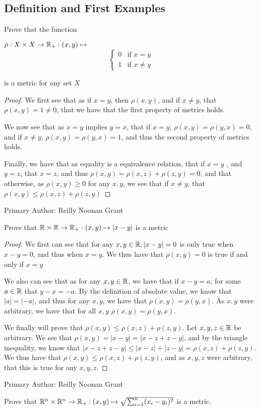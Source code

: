 \subsection{Definition and First Examples}

\begin{majorEx}%
  Prove that the function
  \begin{center}
  $\rho : X \times X \rightarrow \mathbb{R}_+ : (x,y) \mapsto $
  \[ \begin{cases} 
    0 & \text{if } x=y \\
    1 & \text{if } x \neq y 
  \end{cases}
  \]
\end{center}
\end{majorEx}
is a metric for any set $X$
\begin{proof}
   We first see that as if $x=y$, then $\rho(x,y)$, and if $x\neq y$, that $\rho(x,y)=1\neq 0$, that we have that the first property of metrics holds.

   We now see that as $x=y$ implies $y=x$, that if $x=y$, 
   $\rho(x,y)=\rho(y,x)=0$, and if $x\neq y$, $\rho(x,y)=\rho(y,x)=1$, and thus the 
   second property of metrics holds.

   Finally, we have that as equality is a equivalence relation, that if $x=y$ , and $y=z$, 
   that $x=z$, and thus $\rho(x,y) = \rho(x,z)+ \rho(z,y)=0$, and that otherwise, as $\rho(x,y)\geq 0$ for any $x,y$, we see that if $x\neq y$, that $\rho(x,y) \leq \rho(x,z)+ \rho(z,y)$   
\end{proof}  
Primary Author: Reilly Noonan Grant
  

\begin{majorEx} %
  Prove that $\mathbb{R} \times \mathbb{R} \rightarrow  \mathbb{R}_+ : (x,y) \mapsto |x-y|$ is a metric
\end{majorEx}

\begin{proof}
  We first can see that for any $x,y \in \mathbb{R}, |x-y|=0$ is only true when $x-y=0$, and thus
  when $x=y$. We thus have that $\rho(x,y)=0$ is true if and only if $x=y$
  
  We also can see that as for any $x,y\in \mathbb{R}$, we have that if
  $x-y=a$, for some $a\in \mathbb{R}$ that  $y-x={-a}$. By the definition of
  absolute value, we know that $|a| = |{-a}|$, and thus for any $x,y$,
  we have that $\rho(x,y) = \rho(y,x)$. As $x,y$ were arbitrary, we
  have that for all $x,y$ $\rho(x,y) = \rho(y,x)$.

  We finally will prove that $\rho(x,y) \leq \rho(x,z) + \rho(z,y)$.
  Let $x,y,z \in \mathbb{R}$ be arbitrary. We see that $\rho(x,y)= |x-y| = |x-z+z-y|$,
  and by the triangle inequality, we know that $|x-z+z-y|\leq |x-z| +
  |z-y|=\rho(x,z)+ \rho(z,y)$. We thus have that $\rho(x,y) \leq
  \rho(x,z) + \rho(z,y)$, and as $x,y,z$ were arbitrary, that this is
  true for any $x,y,z$.
\end{proof}
Primary Author: Reilly Noonan Grant

\begin{majorEx}
    Prove that $\mathbb{R}^n \times \mathbb{R}^n \to \mathbb{R}_+ : (x,y) \mapsto
    \sqrt{\sum_{i=1}^{n}(x_i - y_i)^2}$ is a metric.
\end{majorEx}

